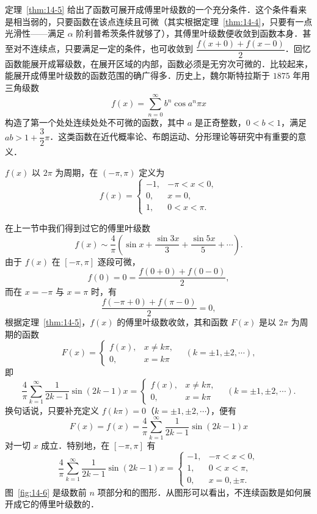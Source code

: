 定理~\ref{thm:14-5} 给出了函数可展开成傅里叶级数的一个充分条件．这个条件看来是相当弱的，只要函数在该点连续且可微（其实根据定理~\ref{thm:14-4}，只要有一点光滑性——满足 $\alpha$ 阶利普希茨条件就够了），其傅里叶级数便收敛到函数本身．甚至对不连续点，只要满足一定的条件，也可收敛到 $\dfrac{f(x+0)+f(x-0)}{2}$．回忆函数能展开成幂级数，在展开区域的内部，函数必须是无穷次可微的．比较起来，能展开成傅里叶级数的函数范围的确广得多．历史上，魏尔斯特拉斯于 $1875$ 年用三角级数
\[
f(x)=\sum_{n=0}^{\infty}b^{n}\cos a^{n}\pi x
\]
构造了第一个处处连续处处不可微的函数，其中 $a$ 是正奇整数，$0<b<1$，满足 $ab>1+\dfrac{3}{2}\pi$．这类函数在近代概率论、布朗运动、分形理论等研究中有重要的意义．

\begin{example}\label{ex:14-2-1}
$f(x)$ 以 $2\pi$ 为周期，在 $(-\pi,\pi)$ 定义为
\[
f(x)=\begin{cases}
-1, & -\pi<x<0,\\
0, & x=0,\\
1, & 0<x<\pi.
\end{cases}
\]
\end{example}

在上一节中我们得到过它的傅里叶级数
\[
f(x)\sim\frac{4}{\pi}\left(\sin x+\frac{\sin 3x}{3}+\frac{\sin 5x}{5}+\cdots\right).
\]
由于 $f(x)$ 在 $[-\pi,\pi]$ 逐段可微，
\[
f(0)=0=\frac{f(0+0)+f(0-0)}{2},
\]
而在 $x=-\pi$ 与 $x=\pi$ 时，有
\[
\frac{f(-\pi+0)+f(\pi-0)}{2}=0,
\]
根据定理~\ref{thm:14-5}，$f(x)$ 的傅里叶级数收敛，其和函数 $F(x)$ 是以 $2\pi$ 为周期的函数
\[
F(x)=\begin{cases}
f(x), & x\neq k\pi,\\
0, & x=k\pi
\end{cases}\quad(k=\pm 1,\pm 2,\cdots),
\]
即
\[
\frac{4}{\pi}\sum_{k=1}^{\infty}\frac{1}{2k-1}\sin(2k-1)x=\begin{cases}
f(x), & x\neq k\pi,\\
0, & x=k\pi
\end{cases}\quad(k=\pm 1,\pm 2,\cdots).
\]
换句话说，只要补充定义 $f(k\pi)=0$（$k=\pm 1,\pm 2,\cdots$），便有
\[
F(x)=f(x)=\frac{4}{\pi}\sum_{k=1}^{\infty}\frac{1}{2k-1}\sin(2k-1)x
\]
对一切 $x$ 成立．特别地，在 $[-\pi,\pi]$ 有
\[
\frac{4}{\pi}\sum_{k=1}^{\infty}\frac{1}{2k-1}\sin(2k-1)x=\begin{cases}
-1, & -\pi<x<0,\\
1, & 0<x<\pi,\\
0, & x=0,\pm\pi.
\end{cases}
\]
图~\ref{fig:14-6} 是级数前 $n$ 项部分和的图形．从图形可以看出，不连续函数是如何展开成它的傅里叶级数的．

